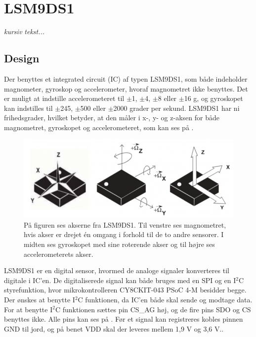 \section{LSM9DS1}
\textit{kursiv tekst...}
\subsection{Design}
Der benyttes et integrated circuit (IC) af typen LSM9DS1, som både indeholder magnometer, gyroskop og accelerometer, hvoraf magnometret ikke benyttes. Det er muligt at indstille accelerometeret til $\pm$1, $\pm$4, $\pm$8 eller $\pm$16 g, og gyroskopet kan indstilles til $\pm$245, $\pm$500 eller $\pm$2000 grader per sekund. \citep{Jimb02016} \newline
LSM9DS1 har ni frihedsgrader, hvilket betyder, at den måler i x-, y- og z-aksen for både magnometret, gyroskopet og accelerometeret, som kan ses på . %
\citep{Jimb02016}\newline 
\begin{figure}[H]
	\centering
	\includegraphics[scale=0.6]{figures/cDesign/LSM9DS1.png}
	\caption{På figuren ses akserne fra LSM9DS1. Til venstre ses magnometret, hvis akser er drejet én omgang i forhold til de to andre sensorer. I midten ses gyroskopet med sine roterende akser og til højre ses accelerometerets akser.\citep{Jimb02016}}
	\label{vores_IC}
\end{figure}
LSM9DS1 er en digital sensor, hvormed de analoge signaler konverteres til digitale i IC'en. De digitaliserede signal kan både bruges med en SPI og en I$^{2}$C styrefunktion, hvor mikrokontrolleren CY8CKIT-043 PSoC 4-M besidder begge. Der ønskes at benytte I$^{2}$C funktionen, da IC'en både skal sende og modtage data. For at benytte I$^{2}$C funktionen sættes pin CS\_AG høj, og de fire pins SDO og CS benyttes ikke. Alle pins kan ses på . Før et signal kan registreres kobles pinnen GND til jord, og på benet VDD skal der leveres mellem 1,9 V og 3,6 V.. 
